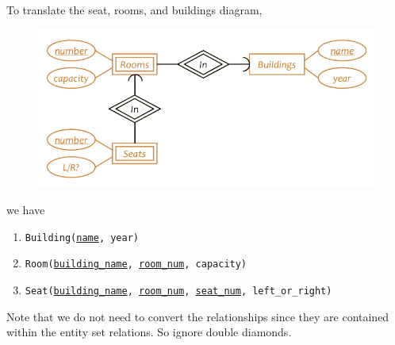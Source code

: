   \begin{example}
    To translate the seat, rooms, and buildings diagram, 
    \begin{figure}[H]
      \centering 
      \includegraphics[scale=0.4]{img/seat.png}
      \caption{} 
      \label{fig:seat}
    \end{figure}
    we have 
    \begin{enumerate}
      \item \texttt{Building(\underline{name}, year)} 
      \item \texttt{Room(\underline{building\_name}, \underline{room\_num}, capacity)}
      \item \texttt{Seat(\underline{building\_name}, \underline{room\_num}, \underline{seat\_num}, left\_or\_right)}
    \end{enumerate}
    Note that we do not need to convert the relationships since they are contained within the entity set relations. So ignore double diamonds. 
  \end{example}

